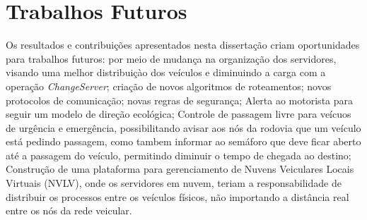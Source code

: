 \documentclass[
	12pt,				%
	oneside,			%
	a4paper,			%
	english,			%
	brazil				%
	]{abntex2ppgsi}
\begin{document}
\section{Trabalhos Futuros}

Os resultados e contribuições apresentados nesta dissertação criam oportunidades para trabalhos futuros: por meio de mudança na organização dos servidores, visando uma melhor distribuiçào dos veículos e diminuindo a carga com a operação \textit{ChangeServer}; criação de novos algoritmos de roteamentos; novos protocolos de comunicação; novas regras de segurança; Alerta ao motorista para seguir um modelo de direção ecológica; Controle de passagem livre para veícuos de urgência e emergência, possibilitando avisar aos nós da rodovia que um veículo está pedindo passagem, como tambem informar ao semáforo que deve ficar aberto até a passagem do veículo, permitindo diminuir o tempo de chegada ao destino; Construção de uma plataforma para gerenciamento de Nuvens Veiculares Locais Virtuais (NVLV), onde os servidores em nuvem, teriam a responsabilidade de distribuir os processos entre os veículos físicos, não importando a distância real entre os nós da rede veicular.


\postextual



%
%






\end{document}
